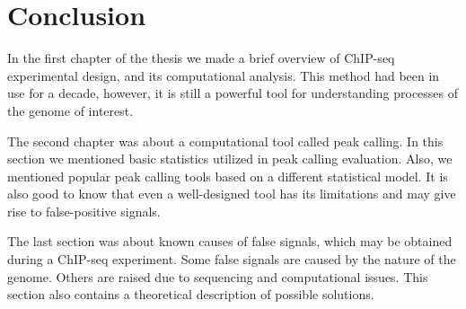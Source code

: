\chapter*{Conclusion}

In the first chapter of the thesis we made a brief overview of ChIP-seq experimental design, and its computational analysis.
This method had been in use for a decade, however, it is still a powerful tool for understanding processes of the genome of interest.


The second chapter was about a computational tool called peak calling.
In this section we mentioned basic statistics utilized in peak calling evaluation. 
Also, we mentioned popular peak calling tools based on a different statistical model.
It is also good to know that even a well-designed tool has its limitations and may give rise to false-positive signals.

The last section was about known causes of false signals, which may be obtained during a ChIP-seq experiment.
Some false signals are caused by the nature of the genome. 
Others are raised due to sequencing and computational issues.
This section also contains a theoretical description of possible solutions. 
